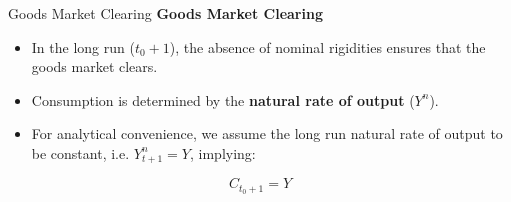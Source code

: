 \documentclass[11pt,aspectratio=169]{beamer}
\begin{document}
\begin{frame}{Goods Market Clearing}
\small
\textbf{Goods Market Clearing}
\begin{itemize}
    \item In the long run ($t_0+1$), the absence of nominal rigidities ensures that the goods market clears.
    \vspace{0.3em}
    \item Consumption is determined by the \textbf{natural rate of output} ($Y^n$).
    \vspace{0.3em}
    \item For analytical convenience, we assume the long run natural rate of output to be constant, i.e. $Y_{t+1}^{n} = Y$, implying:
\end{itemize}
\begin{equation*}
    C_{t_{0}+1} = Y
    \label{LongRunCons}
\end{equation*}
\end{frame}
\end{document}
